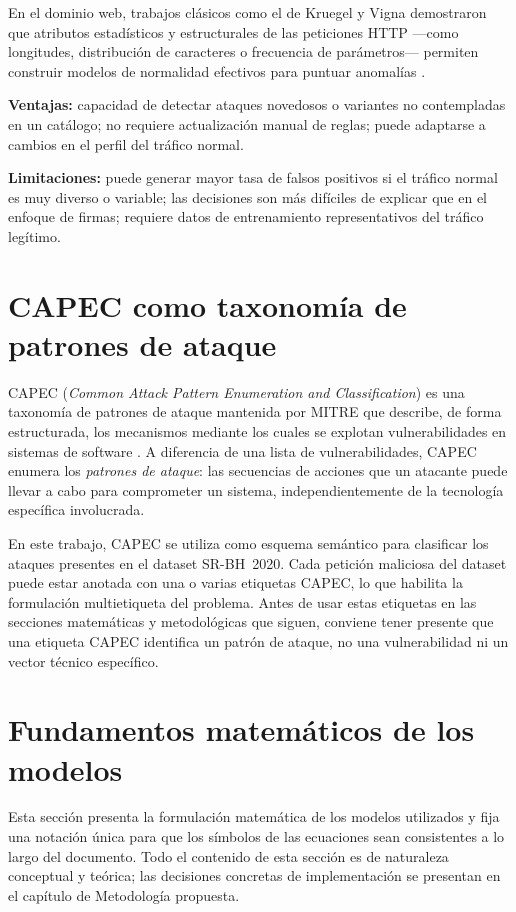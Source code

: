 \documentclass[12pt,oneside]{report}
\begin{document}
En el dominio web, trabajos clásicos como el de Kruegel y Vigna demostraron que atributos estadísticos y estructurales de las peticiones HTTP —como longitudes, distribución de caracteres o frecuencia de parámetros— permiten construir modelos de normalidad efectivos para puntuar anomalías \cite{kruegel_vigna_2003}.

\textbf{Ventajas:} capacidad de detectar ataques novedosos o variantes no contempladas en un catálogo; no requiere actualización manual de reglas; puede adaptarse a cambios en el perfil del tráfico normal.

\textbf{Limitaciones:} puede generar mayor tasa de falsos positivos si el tráfico normal es muy diverso o variable; las decisiones son más difíciles de explicar que en el enfoque de firmas; requiere datos de entrenamiento representativos del tráfico legítimo.

\section{CAPEC como taxonomía de patrones de ataque}

CAPEC (\textit{Common Attack Pattern Enumeration and Classification}) es una taxonomía de patrones de ataque mantenida por MITRE que describe, de forma estructurada, los mecanismos mediante los cuales se explotan vulnerabilidades en sistemas de software \cite{capec_home,capec_about}. A diferencia de una lista de vulnerabilidades, CAPEC enumera los \textit{patrones de ataque}: las secuencias de acciones que un atacante puede llevar a cabo para comprometer un sistema, independientemente de la tecnología específica involucrada.

En este trabajo, CAPEC se utiliza como esquema semántico para clasificar los ataques presentes en el dataset SR-BH~2020. Cada petición maliciosa del dataset puede estar anotada con una o varias etiquetas CAPEC, lo que habilita la formulación multietiqueta del problema. Antes de usar estas etiquetas en las secciones matemáticas y metodológicas que siguen, conviene tener presente que una etiqueta CAPEC identifica un patrón de ataque, no una vulnerabilidad ni un vector técnico específico.

\section{Fundamentos matemáticos de los modelos}

Esta sección presenta la formulación matemática de los modelos utilizados y fija una notación única para que los símbolos de las ecuaciones sean consistentes a lo largo del documento. Todo el contenido de esta sección es de naturaleza conceptual y teórica; las decisiones concretas de implementación se presentan en el capítulo de Metodología propuesta.
\end{document}
